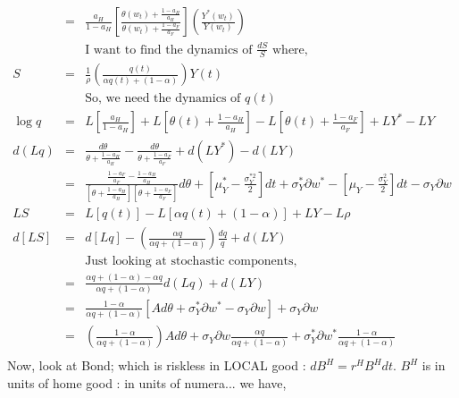 \documentclass[]{article}
\begin{document}
\begin{eqnarray*}
&=& \frac{a_H}{1-a_H} \left[\frac{\theta (w_t) + \frac{1-a_H}{a_H}}{\theta (w_t) + \frac{1-a_F}{a_F}}\right] \left(\frac{Y^*(w_t)}{Y(w_t)}\right)\\
&& \mbox{I want to find the dynamics of $\frac{dS}{S}$ where,}\\
S &=& \frac{1}{\rho} \left(\frac{q(t)}{\alpha q(t) + (1-\alpha)}\right) Y(t)\\
&& \mbox{So, we need the dynamics of $q(t)$}\\
\log q &=& L\left[\frac{a_H}{1-a_H}\right] + L\left[\theta(t) + \frac{1-a_H}{a_H}\right] - L \left[\theta(t) + \frac{1-a_F}{a_F}\right] + L Y^* - L Y\\
d(Lq) &=& \frac{d\theta}{\theta + \frac{1-a_H}{a_H}} - \frac{d\theta}{\theta + \frac{1-a_F}{a_F}} + d(LY^*) - 
d(LY)\\
&=& \frac{\frac{1-a_F}{a_F}-\frac{1-a_H}{a_H}}{\left[\theta + \frac{1-a_H}{a_H}\right]\left[\theta + \frac{1-a_F}{a_F}\right]} d\theta + \left[\mu_Y^* - \frac{\sigma_Y^{*2}}{2}\right] dt + \sigma_Y^* \partial w^* - \left[\mu_Y - \frac{\sigma_Y ^2}{2}\right]dt - \sigma_Y \partial w\\
LS &=& L[q(t)] - L[\alpha q(t) + (1-\alpha)] + LY - L\rho\\
d[LS] &=& d[Lq] - \left(\frac{\alpha q}{\alpha q + (1-\alpha)}\right) \frac{dq}{q} + d(LY)\\
&& \mbox{Just looking at stochastic components,}\\
&=& \frac{\alpha q + (1-\alpha) - \alpha q}{\alpha q + (1-\alpha)} d(Lq) + d(LY)\\
&=& \frac{1-\alpha}{\alpha q + (1-\alpha)} [A d\theta + \sigma_Y^* \partial w^* - \sigma_Y \partial w] + \sigma_Y \partial w\\
&=& \left(\frac{1-\alpha}{\alpha q + (1-\alpha)}\right) A d\theta + \sigma_Y \partial w \frac{\alpha q}{\alpha q + (1-\alpha)} + \sigma_Y^* \partial w^* \frac{1-\alpha}{\alpha q + (1-\alpha)}\\
\end{eqnarray*}
Now, look at Bond; which is riskless in LOCAL good : $dB^H = r^H B^H dt$. $B^H$ is in units of home good :  in units of numera... we have,
\end{document}
